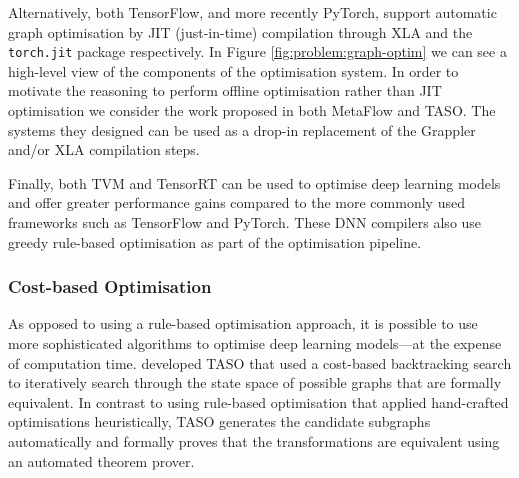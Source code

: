 Alternatively, both TensorFlow, and more recently PyTorch, support automatic graph optimisation by JIT (just-in-time) compilation through XLA and the \texttt{torch.jit} package respectively. In Figure \ref{fig:problem:graph-optim} we can see a high-level view of the components of the optimisation system. In order to motivate the reasoning to perform offline optimisation rather than JIT optimisation we consider the work proposed in both MetaFlow and TASO. The systems they designed can be used as a drop-in replacement of the Grappler and/or XLA compilation steps.

Finally, both TVM \cite{chen2018tvm} and TensorRT \cite{tensorrt2017} can be used to optimise deep learning models and offer greater performance gains compared to the more commonly used frameworks such as TensorFlow and PyTorch. These DNN compilers also use greedy rule-based optimisation as part of the optimisation pipeline.




\subsubsection{Cost-based Optimisation}
\label{sec:bg:subsec:cbo}

As opposed to using a rule-based optimisation approach, it is possible to use more sophisticated algorithms to optimise deep learning models---at the expense of computation time. \citet{jia2019taso} developed TASO that used a cost-based backtracking search to iteratively search through the state space of possible graphs that are formally equivalent. In contrast to using rule-based optimisation that applied hand-crafted optimisations heuristically, TASO generates the candidate subgraphs automatically and formally proves that the transformations are equivalent using an automated theorem prover.

